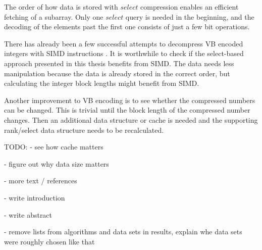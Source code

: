 The order of how data is stored with $select$ compression enables an efficient fetching of a subarray. Only one $select$ query is needed in the beginning, and the decoding of the elements past the first one 
consists of just a few bit operations. 


There has already been a few successful attempts to decompress VB encoded integers with SIMD instructions \citep{Lem18,Pla15}. It is worthwhile to check if the select-based approach presented 
in this thesis benefits from SIMD. The data needs less manipulation because the data is already stored in the correct order, but calculating the integer block lengths might benefit from SIMD.

Another improvement to VB encoding is to see whether the compressed numbers can be changed. This is trivial until the block length of the compressed number changes. Then an additional data structure or 
cache is needed and the supporting rank/select data structure needs to be recalculated.

TODO:
 - see how cache matters

 - figure out why data size matters

 - more text / references

 - write introduction

 - write abstract

 - remove lists from algorithms and data sets in results, explain whe data sets were roughly chosen like that


